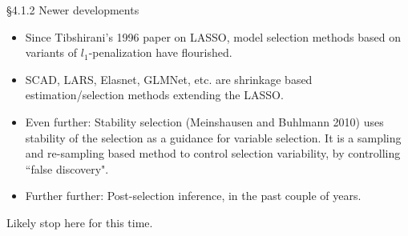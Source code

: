 \documentclass{beamer}
\begin{document}
\begin{frame}{\S4.1.2 Newer developments}
\begin{itemize}

\item
Since Tibshirani's 1996 paper on LASSO, model selection methods based on variants of $l_1$-penalization have flourished. 
\item
SCAD, LARS, Elasnet, GLMNet, etc. are shrinkage based estimation/selection methods extending the LASSO.
\item
Even further: Stability selection (Meinshausen and Buhlmann 2010) uses  stability of the selection as a guidance for variable selection.
It is a sampling and re-sampling based method to control selection variability, by controlling ``false discovery".
\item Further further: Post-selection inference, in the past couple of years. 
\end{itemize}
\end{frame}

\begin{frame}

Likely stop here for this time.

\end{frame}
\end{document}
